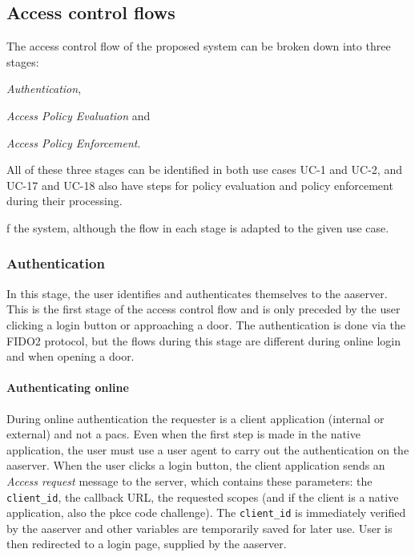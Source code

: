 \subsection{Access control flows}
The access control flow of the proposed system can be broken down into three stages:
\begin{enumerate*}[label=(\roman*)]
    \item \textit{Authentication},
    \item \textit{Access Policy Evaluation} and
    \item \textit{Access Policy Enforcement}.
\end{enumerate*}

All of these three stages can be identified in both use cases UC-1 and UC-2, and UC-17 and UC-18 also have steps for policy evaluation and policy enforcement during their processing.

f the system, although the flow in each stage is adapted to the given use case.

\subsubsection{Authentication}
In this stage, the user identifies and authenticates themselves to the \acrshort{aaserver}. This is the first stage of the access control flow and is only preceded by the user clicking a login button or approaching a door. The authentication is done via the FIDO2 protocol, but the flows during this stage are different during online login and when opening a door.

\paragraph{Authenticating online} During online authentication the requester is a client application (internal or external) and not a \acrshort{pacs}. Even when the first step is made in the native application, the user must use a user agent to carry out the authentication on the \acrshort{aaserver}. When the user clicks a login button, the client application sends an \textit{Access request} message to the server, which contains these parameters: the \texttt{client\_id}, the callback URL, the requested scopes (and if the client is a native application, also the \acrshort{pkce} code challenge). The \texttt{client\_id} is immediately verified by the \acrshort{aaserver} and other variables are temporarily saved for later use. User is then redirected to a login page, supplied by the \acrshort{aaserver}. 

